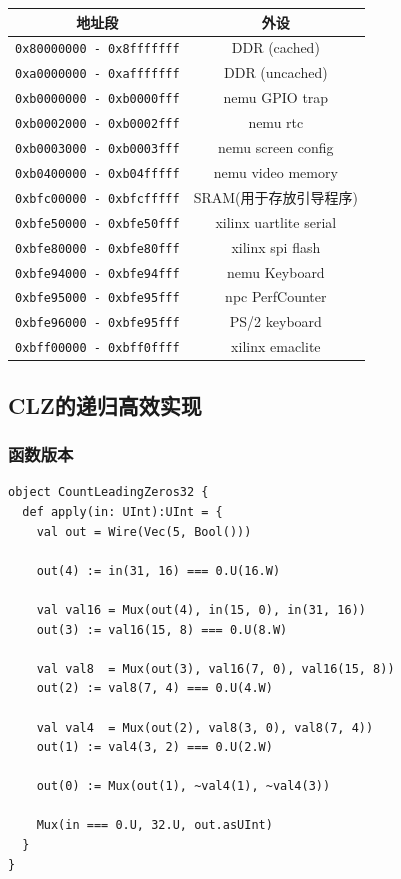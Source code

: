 \documentclass[lang=cn,11pt,a4paper]{elegantpaper}
\begin{document}
\begin{table}[H]
\centering
\begin{tabular}{|c|c|}
\hline
 地址段 & 外设 \\\hline
\lstinline!0x80000000 - 0x8fffffff! & DDR (cached) \\\hline
\lstinline!0xa0000000 - 0xafffffff! & DDR (uncached) \\\hline
\lstinline!0xb0000000 - 0xb0000fff! & nemu GPIO trap \\\hline
\lstinline!0xb0002000 - 0xb0002fff! & nemu rtc \\\hline
\lstinline!0xb0003000 - 0xb0003fff! & nemu screen config \\\hline
\lstinline!0xb0400000 - 0xb04fffff! & nemu video memory \\\hline
\lstinline!0xbfc00000 - 0xbfcfffff! & SRAM(用于存放引导程序) \\\hline
\lstinline!0xbfe50000 - 0xbfe50fff! & xilinx uartlite serial \\\hline
\lstinline!0xbfe80000 - 0xbfe80fff! & xilinx spi flash \\\hline
\lstinline!0xbfe94000 - 0xbfe94fff! & nemu Keyboard \\\hline
\lstinline!0xbfe95000 - 0xbfe95fff! & npc PerfCounter \\\hline
\lstinline!0xbfe96000 - 0xbfe95fff! & PS/2 keyboard \\\hline
\lstinline!0xbff00000 - 0xbff0ffff! & xilinx emaclite \\\hline
\end{tabular}
\end{table}



\subsection{CLZ的递归高效实现}
\subsubsection{函数版本}

\begin{lstlisting}
object CountLeadingZeros32 {
  def apply(in: UInt):UInt = {
    val out = Wire(Vec(5, Bool()))

    out(4) := in(31, 16) === 0.U(16.W)

    val val16 = Mux(out(4), in(15, 0), in(31, 16))
    out(3) := val16(15, 8) === 0.U(8.W)

    val val8  = Mux(out(3), val16(7, 0), val16(15, 8))
    out(2) := val8(7, 4) === 0.U(4.W)

    val val4  = Mux(out(2), val8(3, 0), val8(7, 4))
    out(1) := val4(3, 2) === 0.U(2.W)

    out(0) := Mux(out(1), ~val4(1), ~val4(3))

    Mux(in === 0.U, 32.U, out.asUInt)
  }
}
\end{lstlisting}
\end{document}
